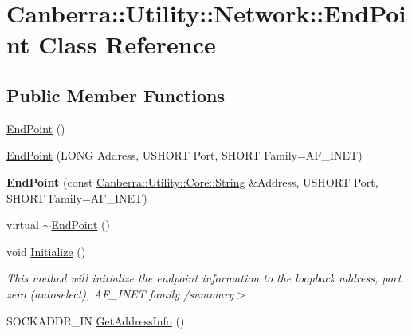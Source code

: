 \hypertarget{class_canberra_1_1_utility_1_1_network_1_1_end_point}{}\section{Canberra\+:\+:Utility\+:\+:Network\+:\+:End\+Point Class Reference}
\label{class_canberra_1_1_utility_1_1_network_1_1_end_point}
\subsection*{Public Member Functions}
\begin{DoxyCompactItemize}
\item 
\hyperlink{class_canberra_1_1_utility_1_1_network_1_1_end_point_a7703ea225c0604da4a5b20d89b95094f_a7703ea225c0604da4a5b20d89b95094f}{End\+Point} ()
\item 
\hyperlink{class_canberra_1_1_utility_1_1_network_1_1_end_point_a56123403e1f6f6dc03244a5605f34163_a56123403e1f6f6dc03244a5605f34163}{End\+Point} (L\+O\+NG Address, U\+S\+H\+O\+RT Port, S\+H\+O\+RT Family=A\+F\+\_\+\+I\+N\+ET)
\item 
\mbox{\label{class_canberra_1_1_utility_1_1_network_1_1_end_point_ac8d12c7d9e82ee0bff87ef24ab7f778a}} 
{\bfseries End\+Point} (const \hyperlink{class_canberra_1_1_utility_1_1_core_1_1_string}{Canberra\+::\+Utility\+::\+Core\+::\+String} \&Address, U\+S\+H\+O\+RT Port, S\+H\+O\+RT Family=A\+F\+\_\+\+I\+N\+ET)
\item 
virtual \hyperlink{class_canberra_1_1_utility_1_1_network_1_1_end_point_a894bac13908b20ed101915ef380ec93a_a894bac13908b20ed101915ef380ec93a}{$\sim$\+End\+Point} ()
\item 
void \hyperlink{class_canberra_1_1_utility_1_1_network_1_1_end_point_a45b17740a2dcf339c2695f5aeca748be_a45b17740a2dcf339c2695f5aeca748be}{Initialize} ()
\begin{DoxyCompactList}\small\item\em This method will initialize the endpoint information to the loopback address, port zero (autoselect), A\+F\+\_\+\+I\+N\+ET family /summary$>$ \end{DoxyCompactList}\item 
S\+O\+C\+K\+A\+D\+D\+R\+\_\+\+IN \hyperlink{class_canberra_1_1_utility_1_1_network_1_1_end_point_a22818c23bbae490c36e0d388dde3dc2d_a22818c23bbae490c36e0d388dde3dc2d}{Get\+Address\+Info} ()

\end{DoxyCompactItemize}
